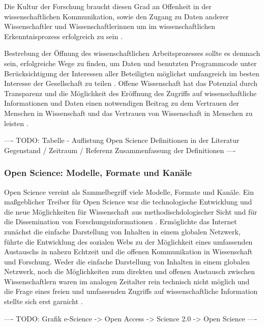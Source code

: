 Die Kultur der Forschung braucht diesen Grad an Offenheit in der wissenschaftlichen Kommunikation, sowie den Zugang zu Daten anderer Wissenschaftler und Wissenschaftlerinnen um im wissenschaftlichen Erkenntnisprozess erfolgreich zu sein \cite{Fecher_2015} \cite{Krumholz_2014} \cite{patlak_2010_open}.

Bestrebung der Öffnung des wissenschaftlichen Arbeitsprozesses sollte es demnach sein, erfolgreiche Wege zu finden, um Daten und benutzten Programmcode unter Berücksichtigung der Interessen aller Beteiligten möglichst umfangreich im besten Interesse der Gesellschaft zu teilen \cite{naeder_2010_open} \cite{Ross_2013} \cite{hey_2015_open}. Offene Wissenschaft hat das Potenzial durch Transparenz und die Möglichkeit des Eröffnung des Zugriffs auf wissenschaftliche Informationen und Daten einen notwendigen Beitrag zu dem Vertrauen der Menschen in Wissenschaft und das Vertrauen von Wissenschaft in Menschen zu leisten \cite{grand_2012_open}.

---- TODO: Tabelle - Auflistung Open Science Definitionen in der Literatur Gegenstand / Zeitraum / Referenz Zusammenfassung der Definitionen ----

\subsubsection{Open Science: Modelle, Formate und Kanäle}

Open Science vereint als Sammelbegriff viele Modelle, Formate und Kanäle. Ein maßgeblicher Treiber für Open Science war die technologische Entwicklung und die neue Möglichkeiten für Wissenschaft aus methodischdologischer Sicht und für die Dissemination von Forschungsinformationen \cite{garcia_2010_open}. Ermöglichte das Internet zunächst die einfache Darstellung von Inhalten in einem globalen Netzwerk, führte die Entwicklung des sozialen Webs zu der Möglichkeit eines umfassenden Austauschs in nahezu Echtzeit und die offenen Kommunikation in Wissenschaft und Forschung. Weder die einfache Darstellung von Inhalten in einem globalen Netzwerk, noch die Möglichkeiten zum direkten und offenen Austausch zwischen Wissenschaftlern waren im analogen Zeitalter rein technisch nicht möglich und die Frage eines freien und umfassenden Zugriffs auf wissenschaftliche Information stellte sich erst garnicht \cite{Schirmbacher_oa_2007}.

---- TODO: Grafik e-Science -> Open Access -> Science 2.0 -> Open Science ----

